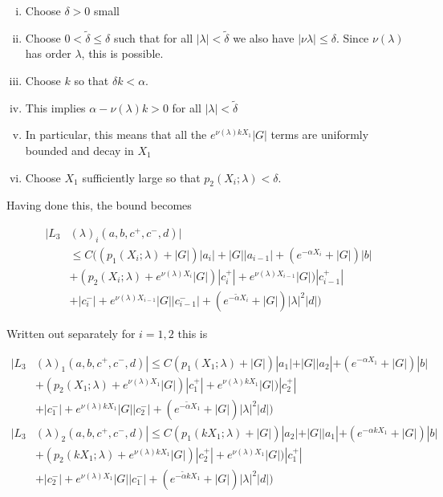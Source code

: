 \documentclass[12pt]{article}
\begin{document}
\begin{enumerate}
\begin{enumerate}[(i)]
\item Choose $\delta > 0$ small
\item Choose $0 < \tilde{\delta} \leq \delta$ such that for all $|\lambda| < \tilde{\delta}$ we also have $|\nu{\lambda}| \leq \delta$. Since $\nu(\lambda)$ has order $\lambda$, this is possible.
\item Choose $k$ so that $\delta k < \alpha$. 
\item This implies $\alpha - \nu(\lambda) k > 0$ for all $|\lambda| < \tilde{\delta}$
\item In particular, this means that all the $e^{\nu(\lambda)k X_1} |G|$ terms are uniformly bounded and decay in $X_1$
\item Choose $X_1$ sufficiently large so that $p_2(X_i; \lambda) < \delta$.
\end{enumerate}

Having done this, the bound becomes

\begin{align*}
|L_3&(\lambda)_i(a, b, c^+, c^-, d)| \\
&\leq C \Big( (p_1(X_i; \lambda) + |G|)|a_i| + |G||a_{i-1}| + (e^{-\alpha X_i} + |G|) |b| \\
&+ ( p_2(X_i; \lambda) + e^{\nu(\lambda)X_i} |G|) |c_i^+| + e^{\nu(\lambda)X_{i-1}} |G|) |c_{i-1}^+| \\
&+ |c_i^-| + e^{\nu(\lambda)X_{i-1}} |G||c_{i-1}^-| + (e^{-\tilde{\alpha} X_i} + |G|) |\lambda|^2 |d| \Big)
\end{align*} 

Written out separately for $i = 1, 2$ this is 

\begin{align*}
|L_3&(\lambda)_1(a, b, c^+, c^-, d)| \leq C (p_1(X_1; \lambda) + |G|)|a_1| + |G||a_2| + (e^{-\alpha X_1} + |G|) |b|\\
&+ ( p_2(X_1; \lambda) + e^{\nu(\lambda)X_1} |G|) |c_1^+| + e^{\nu(\lambda) k X_1} |G|) |c_2^+|\\
&+ |c_1^-| + e^{\nu(\lambda)k X_1} |G||c_2^-| + (e^{-\tilde{\alpha} X_1} + |G|) |\lambda|^2 |d| ) \\
|L_3&(\lambda)_2(a, b, c^+, c^-, d)| \leq C (p_1(k X_1; \lambda) + |G|)|a_2| + |G||a_1| + (e^{-\alpha k X_1} + |G|) |b| \\
&+ ( p_2(k X_1; \lambda) + e^{\nu(\lambda)k X_1} |G|) |c_2^+| + e^{\nu(\lambda)X_1} |G|) |c_1^+|\\
&+ |c_2^-| + e^{\nu(\lambda)X_1} |G||c_1^-| + (e^{-\tilde{\alpha} k X_1} + |G|) |\lambda|^2 |d| )
\end{align*}


\end{enumerate}
\end{document}
